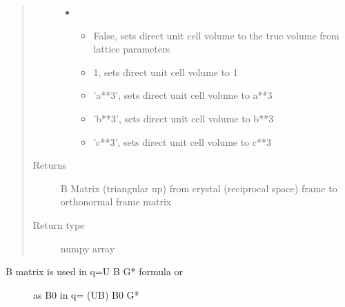 \documentclass[letterpaper,10pt,english]{sphinxmanual}
\begin{document}
\begin{fulllineitems}
\begin{quote}
\begin{description}
\begin{itemize}
\begin{itemize}
\begin{description}
\end{description}

\end{itemize}


\item {} 
 \textendash{} \begin{itemize}
\item {} 
False, sets direct unit cell volume to the true volume from lattice parameters

\item {} 
1,      sets direct unit cell volume to 1

\item {} 
’a**3’,  sets direct unit cell volume to a**3

\item {} 
’b**3’, sets direct unit cell volume to b**3

\item {} 
’c**3’,  sets direct unit cell volume to c**3

\end{itemize}


\end{itemize}

\item[{Returns}] \leavevmode
B Matrix (triangular up) from  crystal (reciprocal space) frame to orthonormal frame matrix

\item[{Return type}] \leavevmode
numpy array

\end{description}\end{quote}
\begin{description}
\item[{B matrix is used in q=U B G* formula or}] \leavevmode
as B0  in q= (UB) B0 G*

\end{description}


\end{fulllineitems}
\end{document}
